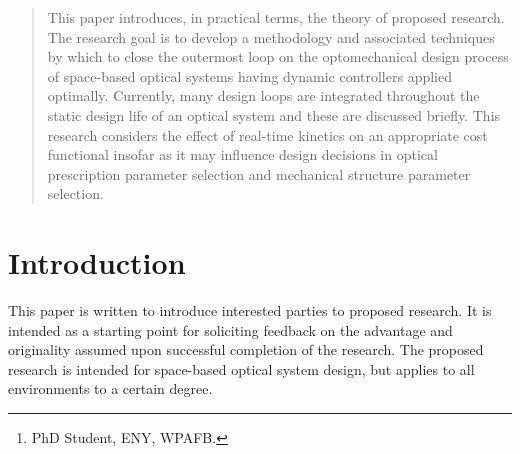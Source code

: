 \documentclass{aiaa-tc}
\author{Timothy E. Coon%
         \thanks{PhD Student, ENY, WPAFB.}\\
         \normalsize\itshape
         AFIT, WPAFB, Ohio, 45433, USA}
\begin{document}
\maketitle

\begin{abstract}
This paper introduces, in practical terms, the theory of proposed research. The research goal is to develop a methodology and associated techniques by which to close the outermost loop on the optomechanical design process of space-based optical systems having dynamic controllers applied optimally. Currently, many design loops are integrated throughout the static design life of an optical system and these are discussed briefly. This research considers the effect of real-time kinetics on an appropriate cost functional insofar as it may influence design decisions in optical prescription parameter selection and mechanical structure parameter selection.
\end{abstract}

%

\section{Introduction}

This paper is written to introduce interested parties to proposed research. It is intended as a starting point for soliciting feedback on the advantage and originality assumed upon successful completion of the research. The proposed research is intended for space-based optical system design, but applies to all environments to a certain degree.
\end{document}
